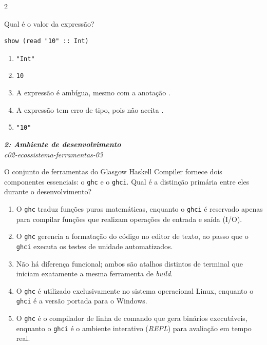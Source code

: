 \documentclass[a4paper,10pt,brazil]{article}
\begin{document}
\begin{multicols}{2}
\begin{flushright}
\end{flushright}
Qual é o valor da expressão?

\begin{verbatim}
show (read "10" :: Int)
\end{verbatim}

\begin{enumerate}
  \item \texttt{"Int"}
  \item \texttt{10}
  \item A expressão é ambígua, mesmo com a anotação .
  \item A expressão tem erro de tipo, pois  não aceita .
  \item \texttt{"10"}

\end{enumerate}

\begin{flushright}
  \footnotesize
  \textit{\textbf{2: Ambiente de desenvolvimento}}\\
  \textit{c02-ecossistema-ferramentas-03}\\

\end{flushright}
O conjunto de ferramentas do Glasgow Haskell Compiler fornece dois componentes essenciais: o \texttt{ghc} e o \texttt{ghci}. Qual é a distinção primária entre eles durante o desenvolvimento?

\begin{enumerate}
  \item O \texttt{ghc} traduz funções puras matemáticas, enquanto o \texttt{ghci} é reservado apenas para compilar funções que realizam operações de entrada e saída (I/O).

  \item O \texttt{ghc} gerencia a formatação do código no editor de texto, ao passo que o \texttt{ghci} executa os testes de unidade automatizados.

  \item Não há diferença funcional; ambos são atalhos distintos de terminal que iniciam exatamente a mesma ferramenta de \emph{build}.

  \item O \texttt{ghc} é utilizado exclusivamente no sistema operacional Linux, enquanto o \texttt{ghci} é a versão portada para o Windows.

  \item O \texttt{ghc} é o compilador de linha de comando que gera binários executáveis, enquanto o \texttt{ghci} é o ambiente interativo (\emph{REPL}) para avaliação em tempo real.



\end{enumerate}
\end{multicols}
\end{document}
